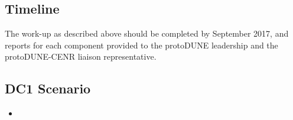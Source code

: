 \documentclass[pdftex,12pt,letter]{article}
\newcommand{\pd}{protoDUNE\xspace}
\begin{document}
\subsection{Timeline}
The work-up as described above should be completed by September 2017, and reports for each component provided
to the \pd leadership and the \pd-CENR liaison representative.

\subsection{DC1 Scenario}

\begin{itemize}

\item 

\end{itemize}
\end{document}
